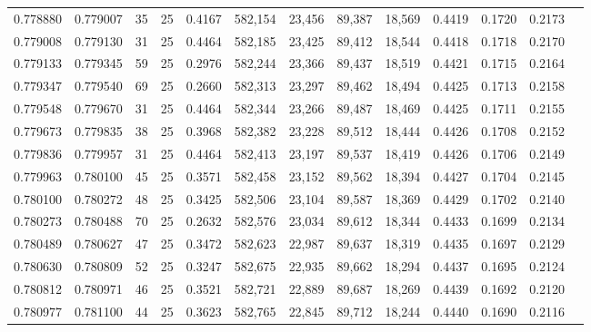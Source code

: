 \begin{tabular}{rrrrrrrrrrrrr}
0.778880 & 0.779007 &    35 &  25 &                                     0.4167 & 582,154 &  23,456 &  89,387 &  18,569 & 0.4419 & 0.1720 & 0.2173 \\
0.779008 & 0.779130 &    31 &  25 &                                     0.4464 & 582,185 &  23,425 &  89,412 &  18,544 & 0.4418 & 0.1718 & 0.2170 \\
0.779133 & 0.779345 &    59 &  25 &                                     0.2976 & 582,244 &  23,366 &  89,437 &  18,519 & 0.4421 & 0.1715 & 0.2164 \\
0.779347 & 0.779540 &    69 &  25 &                                     0.2660 & 582,313 &  23,297 &  89,462 &  18,494 & 0.4425 & 0.1713 & 0.2158 \\
0.779548 & 0.779670 &    31 &  25 &                                     0.4464 & 582,344 &  23,266 &  89,487 &  18,469 & 0.4425 & 0.1711 & 0.2155 \\
0.779673 & 0.779835 &    38 &  25 &                                     0.3968 & 582,382 &  23,228 &  89,512 &  18,444 & 0.4426 & 0.1708 & 0.2152 \\
0.779836 & 0.779957 &    31 &  25 &                                     0.4464 & 582,413 &  23,197 &  89,537 &  18,419 & 0.4426 & 0.1706 & 0.2149 \\
0.779963 & 0.780100 &    45 &  25 &                                     0.3571 & 582,458 &  23,152 &  89,562 &  18,394 & 0.4427 & 0.1704 & 0.2145 \\
0.780100 & 0.780272 &    48 &  25 &                                     0.3425 & 582,506 &  23,104 &  89,587 &  18,369 & 0.4429 & 0.1702 & 0.2140 \\
0.780273 & 0.780488 &    70 &  25 &                                     0.2632 & 582,576 &  23,034 &  89,612 &  18,344 & 0.4433 & 0.1699 & 0.2134 \\
0.780489 & 0.780627 &    47 &  25 &                                     0.3472 & 582,623 &  22,987 &  89,637 &  18,319 & 0.4435 & 0.1697 & 0.2129 \\
0.780630 & 0.780809 &    52 &  25 &                                     0.3247 & 582,675 &  22,935 &  89,662 &  18,294 & 0.4437 & 0.1695 & 0.2124 \\
0.780812 & 0.780971 &    46 &  25 &                                     0.3521 & 582,721 &  22,889 &  89,687 &  18,269 & 0.4439 & 0.1692 & 0.2120 \\
0.780977 & 0.781100 &    44 &  25 &                                     0.3623 & 582,765 &  22,845 &  89,712 &  18,244 & 0.4440 & 0.1690 & 0.2116 \\

\end{tabular}
